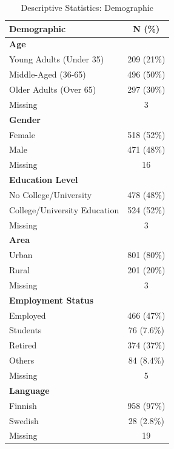 \begin{table}[h]
\centering
\fontsize{12pt}{14pt}\selectfont
\begin{tabular}{@{}l c@{}}
\toprule
\textbf{Demographic} & \textbf{N (\%)} \\
\midrule
\textbf{Age} \\
\quad Young Adults (Under 35)        & 209 (21\%)   \\
\quad Middle-Aged (36-65)            & 496 (50\%)   \\
\quad Older Adults (Over 65)         & 297 (30\%)   \\
\quad Missing                      & 3            \\
\midrule
\addlinespace[2.5pt]
\textbf{Gender} \\
\quad Female               & 518 (52\%)   \\
\quad Male                 & 471 (48\%)   \\
\quad Missing              & 16           \\
\midrule
\addlinespace[2.5pt]
\textbf{Education Level} \\
\quad No College/University        & 478 (48\%)   \\
\quad College/University Education & 524 (52\%)   \\
\quad Missing                      & 3            \\
\midrule
\addlinespace[2.5pt]
\textbf{Area} \\
\quad Urban                & 801 (80\%)   \\
\quad Rural                & 201 (20\%)   \\
\quad Missing              & 3            \\
\midrule
\addlinespace[2.5pt]
\textbf{Employment Status} \\
\quad Employed             & 466 (47\%)   \\
\quad Students               & 76 (7.6\%)   \\
\quad Retired              & 374 (37\%)   \\
\quad Others               & 84 (8.4\%)   \\
\quad Missing              & 5            \\
\midrule
\addlinespace[2.5pt]
\textbf{Language} \\
\quad Finnish              & 958 (97\%)   \\
\quad Swedish              & 28 (2.8\%)   \\
\quad Missing              & 19           \\
\bottomrule
\end{tabular}
\caption{Descriptive Statistics: Demographic}
\label{tab:demographics}
\end{table}

